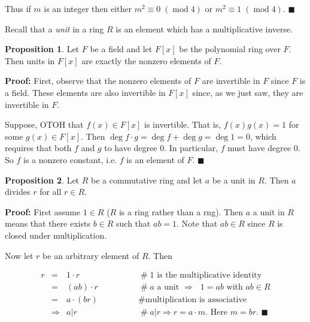 \documentclass[11pt, oneside]{article}   	%
\theoremstyle{definition}
\newtheorem{proposition}{Proposition}[section]
\DeclareMathOperator{\mymod}{\text{mod}}
\begin{document}
\bigskip
\noindent
Thus if $m$ is an integer then either $m^2 \equiv 0 \; (\mymod
4)$ or $m^2 \equiv 1 \; (\mymod 4)$. $\blacksquare$ 

\bigskip
\noindent
Recall that a \emph{unit} in a ring $R$ is an element which has a
multiplicative inverse.  

\begin{proposition}
Let $F$ be a field and let $F[x]$ be the polynomial ring over
$F$. Then units in $F[x]$ are exactly the nonzero elements of
$F$. 
\end{proposition}

\noindent 
\textbf{Proof:} First, observe that the nonzero elements of $F$
are invertible in $F$ since $F$ is a field.  These elements are
also invertible in $F[x]$ since, as we just saw, they are
invertible in $F$.

\bigskip
\noindent
Suppose, OTOH that $f(x) \in F[x] $ is invertible. That is,
$f(x)g(x) = 1$ for some $g(x) \in F [x]$. Then $\deg f \cdot g =
\deg f + \deg g = \deg 1 = 0$, which requires that both $f$ and
$g$ to have degree 0. In particular, $f$ must have degree 0. So
$f$ is a nonzero constant, i.e. $f$ is an element of
$F$. $\blacksquare$


\begin{proposition}
Let $R$ be a commutative ring and let $a$ be a unit in $R$. Then
$a$ divides $r$ for all $r \in R$.
\end{proposition}

\noindent 
\textbf{Proof:} First assume $1 \in R$ ($R$ is a ring rather than
a rng). Then $a$ a unit in $R$ means that there exists $b \in R$
such that $ab = 1$. Note that $ab \in R$ since $R$ is closed
under multiplication.

\bigskip
\noindent
Now let $r$ be an arbitrary element of $R$. Then 

\begin{equation*}
\begin{array}{rlll} 
r
&=& 1 \cdot r           &\qquad\qquad\mathrel{\#} \text{$1$ is the multiplicative identity} \\
&=& (ab) \cdot r        &\qquad\qquad\mathrel{\#} \text{$a$ a unit $\Rightarrow$ $1 = ab$ with $ab \in R$} \\
&=& a \cdot (br)        &\qquad\qquad\mathrel{\#} \text{multiplication is associative} \\
&\Rightarrow& a|r       &\qquad\qquad\mathrel{\#}\text{$a|r \Rightarrow r = a \cdot m$. Here  $m = br$. $\blacksquare$}
\end{array}
\end{equation*}
\end{document}
